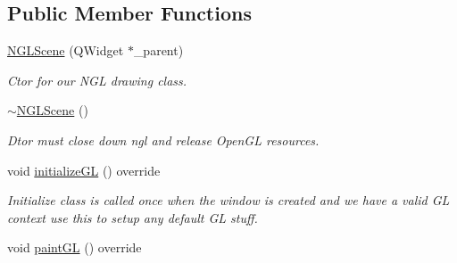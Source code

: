 \subsection*{Public Member Functions}
\begin{DoxyCompactItemize}
\item 
\hyperlink{class_n_g_l_scene_a5c5abd9632cc61aa6bfbb8c237d66f27}{N\+G\+L\+Scene} (Q\+Widget $\ast$\+\_\+parent)
\begin{DoxyCompactList}\small\item\em Ctor for our N\+GL drawing class. \end{DoxyCompactList}\item 
\hyperlink{class_n_g_l_scene_abda05d130945833bfbb6bad8d619f7f5}{$\sim$\+N\+G\+L\+Scene} ()\hypertarget{class_n_g_l_scene_abda05d130945833bfbb6bad8d619f7f5}{}\label{class_n_g_l_scene_abda05d130945833bfbb6bad8d619f7f5}

\begin{DoxyCompactList}\small\item\em Dtor must close down ngl and release Open\+GL resources. \end{DoxyCompactList}\item 
void \hyperlink{class_n_g_l_scene_a3eead0bab68ee568552786d1e879f3b1}{initialize\+GL} () override\hypertarget{class_n_g_l_scene_a3eead0bab68ee568552786d1e879f3b1}{}\label{class_n_g_l_scene_a3eead0bab68ee568552786d1e879f3b1}

\begin{DoxyCompactList}\small\item\em Initialize class is called once when the window is created and we have a valid GL context use this to setup any default GL stuff. \end{DoxyCompactList}\item 
void \hyperlink{class_n_g_l_scene_a3d1b83825c3188fd8fefc1bc10ec359b}{paint\+GL} () override\hypertarget{class_n_g_l_scene_a3d1b83825c3188fd8fefc1bc10ec359b}{}\label{class_n_g_l_scene_a3d1b83825c3188fd8fefc1bc10ec359b}


\end{DoxyCompactItemize}
